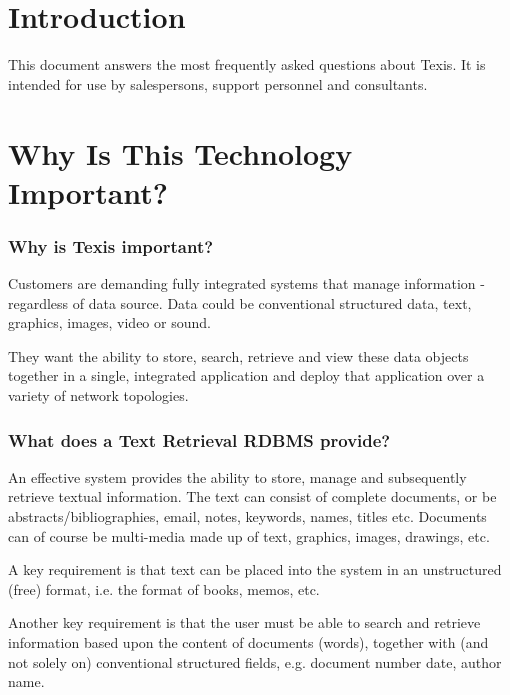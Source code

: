 

\author{Thunderstone Software \\ Expansion Programs International, Inc.}



\tableofcontents
\chapter{Introduction}

This document answers the most frequently asked  questions about
Texis. It is intended for use by salespersons, support personnel and
consultants.

\chapter{Why Is This Technology Important?}

\subsection{Why is Texis important?}

Customers are demanding fully integrated systems that manage information -
regardless of
data source.  Data could be conventional structured data,
text, graphics,
images, video or sound.

They want the ability to store, search, retrieve and view these data
objects together in a single, integrated application and deploy that
application over a variety of network topologies.

\subsection{What does a Text Retrieval RDBMS provide?}

An effective system provides the ability to store, manage
and subsequently retrieve textual information.  The text can consist of
complete documents, or be abstracts/bibliographies, email, notes,
keywords, names, titles etc.  Documents can of course be multi-media
made up of text, graphics, images, drawings, etc.

A key requirement is that text can be placed into the system in an
unstructured (free) format, i.e. the format of books, memos, etc.

Another key requirement is that the user must be able to search and
retrieve information based upon the content of documents (words), together
with (and not solely on) conventional structured fields, e.g. document
number date, author name.

